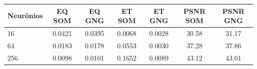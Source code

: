 \begin{tabular}{lcccccc}
\toprule
Neurônios & EQ SOM & EQ GNG & ET SOM & ET GNG & PSNR SOM & PSNR GNG\\
\midrule
16 & 0.0421 & 0.0395 & 0.0068 & 0.0028 & 30.58 & 31.17\\
64 & 0.0183 & 0.0178 & 0.0553 & 0.0030 & 37.28 & 37.86\\
256 & 0.0098 & 0.0101 & 0.1652 & 0.0089 & 43.12 & 43.01\\
\bottomrule
\end{tabular}
